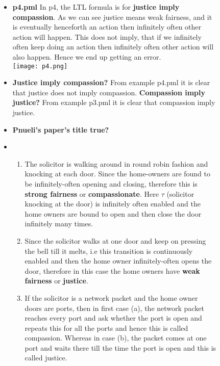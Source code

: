 \documentclass[11pt]{article}
\begin{document}
\begin{enumerate}
\begin{figure}[!h]
\begin{minipage}{\minpagw}
{{\begin{itemize}
        \item \textbf{p4.pml}
        In p4, the LTL formula is for \textbf{justice imply compassion}. As we can see justice means weak fairness, and it is eventually henceforth an action then infinitely often other action will happen. This does not imply, that if we infinitely often keep doing an action then infinitely often other action will also happen. Hence we end up getting an error.\\ \texttt{[image: p4.png]}
        \item \textbf{Justice imply compassion?}
        From example p4.pml it is clear that justice does not imply compassion. \textbf{Compassion imply justice?}
        From example p3.pml it is clear that compassion imply justice.
        \item \textbf{Pnueli's paper's title true?} 
        \item \begin{enumerate}
         \item The solicitor is walking around in round robin fashion and knocking at each door. Since the home-owners are found to be infinitely-often opening and closing, therefore this is \textbf{strong fairness} or \textbf{compassionate}. Here $\tau$ (solicitor knocking at the door) is infinitely often enabled and the home owners are bound to open and then close the door infinitely many times.
         \item Since the solicitor walks at one door and keep on pressing the bell till it melts, i.e this transition is continuously enabled and then the home owner infinitely-often opens the door, therefore in this case the home owners have \textbf{weak fairness} or \textbf{justice}. 
         \item If the solicitor is a network packet and the home owner doors are ports, then in first case (a), the network packet reaches every port and ask whether the port is open and repeats this for all the ports and hence this is called compassion. Whereas in case (b), the packet comes at one port and waits there till the time the port is open and this is called justice.
         
     \end{enumerate}
    \end{itemize}
      
    }%
  }%
\end{minipage}
\end{figure}
\clearpage
  


\end{enumerate}
\end{document}
